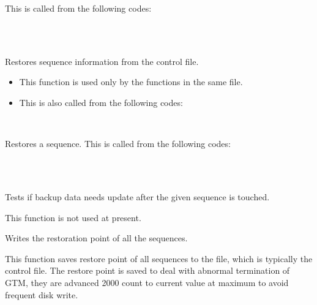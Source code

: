     This is called from the following codes:
    
    \FuncRefHdr
		\\
		\\ \hline
    \FuncRefTrailor
  
  
    Restores sequence information from the control file.
    
	\begin{itemize}
		\item This function is used only by the functions in the same file.
		\item This is also called from the following codes:
	\end{itemize}
    
    \FuncRefHdr
		\\
		\hline
    \FuncRefTrailor
  
  
    Restores a sequence.
    This is called from the following codes:
    
    \FuncRefHdr
		\\
		\\ \hline
    \FuncRefTrailor
  
  
    Tests if backup data needs update after the given sequence is touched.
    
    This function is not used at present.
  
  
    Writes the restoration point of all the sequences.
    
    This function saves restore point of all sequences to the file, which is typically the control file.
    The restore point is saved to deal with abnormal termination of GTM, they are advanced 2000 count to
	current value at maximum to avoid frequent disk write.
    

